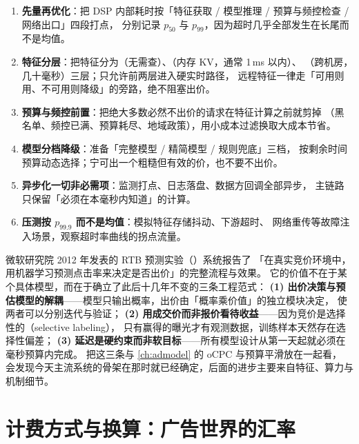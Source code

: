 \begin{toolbox}
\begin{enumerate}
  \item \textbf{先量再优化}：把 DSP 内部耗时按「特征获取 / 模型推理 / 预算与频控检查 / 网络出口」四段打点，
        分别记录 $p_{50}$ 与 $p_{99}$，因为超时几乎全部发生在长尾而不是均值。
  \item \textbf{特征分层}：把特征分为（无需查）、（内存 KV，通常 1\,ms 以内）、
        （跨机房，几十毫秒）三层；只允许前两层进入硬实时路径，
        远程特征一律走「可用则用、不可用则降级」的旁路，绝不阻塞出价。
  \item \textbf{预算与频控前置}：把绝大多数必然不出价的请求在特征计算之前就剪掉
        （黑名单、频控已满、预算耗尽、地域政策），用小成本过滤换取大成本节省。
  \item \textbf{模型分档降级}：准备「完整模型 / 精简模型 / 规则兜底」三档，
        按剩余时间预算动态选择；宁可出一个粗糙但有效的价，也不要不出价。
  \item \textbf{异步化一切非必需项}：监测打点、日志落盘、数据方回调全部异步，
        主链路只保留「必须在本毫秒内知道」的计算。
  \item \textbf{压测按 $p_{99.9}$ 而不是均值}：模拟特征存储抖动、下游超时、
        网络重传等故障注入场景，观察超时率曲线的拐点流量。
\end{enumerate}
\end{toolbox}

\begin{casebox}
微软研究院 2012 年发表的 RTB 预测实验（\cite{perlich2012rtb}）系统报告了
「在真实竞价环境中，用机器学习预测点击率来决定是否出价」的完整流程与效果。
它的价值不在于某个具体模型，而在于确立了此后十几年不变的三条工程范式：
\textbf{(1) 出价决策与预估模型的解耦}——模型只输出概率，出价由「概率乘价值」的独立模块决定，
使两者可以分别迭代与验证；
\textbf{(2) 用成交价而非报价看待收益}——因为竞价是选择性的（selective labeling），
只有赢得的曝光才有观测数据，训练样本天然存在选择性偏差；
\textbf{(3) 延迟是硬约束而非软目标}——所有模型设计从第一天起就必须在毫秒预算内完成。
把这三条与 \cref{ch:admodel} 的 oCPC 与预算平滑放在一起看，
会发现今天主流系统的骨架在那时就已经确定，后面的进步主要来自特征、算力与机制细节。
\end{casebox}

\section{计费方式与换算：广告世界的汇率}

